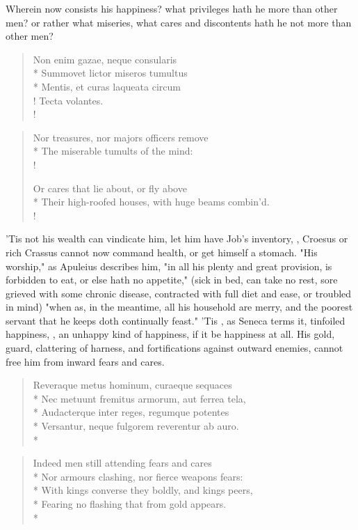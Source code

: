 {Wherein now consists his happiness? what privileges hath he more than other men? or rather what miseries, what cares and discontents hath he not more than other men?

\begin{latin}
\begin{verse}%
Non enim gazae, neque consularis\\*
Summovet lictor miseros tumultus\\*
Mentis, et curas laqueata circum\\!
Tecta volantes.\\!
\end{verse}%
\end{latin}
\translationrule%
\begin{verse}%
Nor treasures, nor majors officers remove\\*
The miserable tumults of the mind:\\!

Or cares that lie about, or fly above\\*
Their high-roofed houses, with huge beams combin'd.\\!
\end{verse}%
%

'Tis not his wealth can vindicate him, let him have Job's inventory, , Croesus or rich Crassus cannot now command health, or get himself a stomach. "His worship," as Apuleius describes him, "in all his plenty and great provision, is forbidden to eat, or else hath no appetite," (sick in bed, can take no rest, sore grieved with some chronic disease, contracted with full diet and ease, or troubled in mind) "when as, in the meantime, all his household are merry, and the poorest servant that he keeps doth continually feast." 'Tis , as Seneca terms it, tinfoiled happiness, , an unhappy kind of happiness, if it be happiness at all. His gold, guard, clattering of harness, and fortifications against outward enemies, cannot free him from inward fears and cares.

\begin{latin}
\begin{verse}%
Reveraque metus hominum, curaeque sequaces\\*
Nec metuunt fremitus armorum, aut ferrea tela,\\*
Audacterque inter reges, regumque potentes\\*
Versantur, neque fulgorem reverentur ab auro.\\*
\end{verse}%
\end{latin}
\translationrule%
\begin{verse}%
Indeed men still attending fears and cares\\*
Nor armours clashing, nor fierce weapons fears:\\*
With kings converse they boldly, and kings peers,\\*
Fearing no flashing that from gold appears.\\*
\end{verse}%

}
